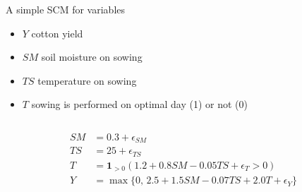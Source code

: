 \documentclass{beamer}
\begin{document}
\begin{frame}
  \begin{example}
    \begin{columns}
      \begin{column}{0.45\textwidth}
    A simple SCM for variables 
    \begin{itemize}
      \item $Y$ cotton yield  
      \item $SM$ soil moisture on sowing 
      \item $TS$ temperature on sowing 
      \item $T$ sowing is performed on optimal day (1)  or not (0)  
    \end{itemize}
      \end{column}
      \begin{column}{0.45\textwidth}

      \end{column}
    \end{columns}

    \begin{align*}
    SM &= 0.3 + \epsilon_{SM} \\
    TS &= 25 + \epsilon_{TS} \\
      T  &= \mathbf{1}_{>0} \left( 1.2 + 0.8 SM - 0.05 TS + \epsilon_T > 0 \right) \\
      Y  &= \max\{0, \, 2.5 + 1.5 SM - 0.07 TS + 2.0 T + \epsilon_Y\} 
\end{align*}
  \end{example}
\end{frame}
\end{document}

